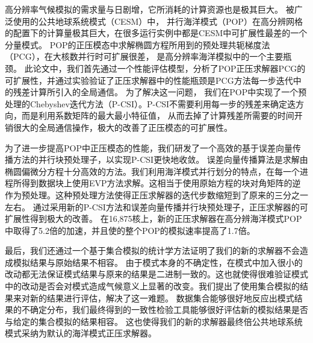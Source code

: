 \begin{cabstract}
  高分辨率气候模拟的需求量与日剧增，它所消耗的计算资源也是极其巨大。 
  被广泛使用的公共地球系统模式（CESM）中， 并行海洋模式（POP）在高分辨网格的配置下的计算量极其巨大，在很多运行实例中都是CESM中可扩展性最差的一个分量模式。 
  POP的正压模态中求解椭圆方程所用到的预处理共轭梯度法（PCG），在大核数并行时可扩展很差， 是高分辨率海洋模拟中的一个主要瓶颈。 
  此论文中，我们首先通过一个性能评估模型，分析了POP正压求解器PCG的可扩展性，并通过实验验证了正压求解器中的性能瓶颈是PCG方法每一步迭代中的残差计算所引入的全局通信。 
  为了解决这一问题， 我们在POP中实现了一个预处理的Chebyshev迭代方法（P-CSI）。P-CSI不需要利用每一步的残差来确定迭方向，而是利用系数矩阵的最大最小特征值，
  从而去掉了计算残差所需要的时间开销很大的全局通信操作，极大的改善了正压模态的可扩展性。

  为了进一步提高POP中正压模态的性能，我们研发了一个高效的基于误差向量传播方法的并行块预处理子，以实现P-CSI更快地收敛。 
  误差向量传播算法是求解由椭圆偏微分方程十分高效的方法。我们利用海洋模式并行划分的特点，在每一个进程所得到数据块上使用EVP方法求解。这相当于使用原始方程的块对角矩阵的逆作为预处理。这种预处理方法使得正压求解器的迭代步数缩短到了原来的三分之一左右。 
  通过采用新的P-CSI方法和误差向量传播并行块预处理子，正压求解器的可扩展性得到极大的改善。 在16,875核上，新的正压求解器在高分辨海洋模式POP中取得了5.2倍的加速，并且使的整个POP的模拟速率提高了1.7倍。 
  

  最后，我们还通过一个基于集合模拟的统计学方法证明了我们的新的求解器不会造成模拟结果与原始结果不相容。 
  由于模式本身的不确定性，在模式中加入很小的改动都无法保证模式结果与原来的结果是二进制一致的。这也就使得很难验证模式中的改动是否会对模式造成气候意义上显著的改变。我们提出了使用集合模拟的结果来对新的结果进行评估，解决了这一难题。 数据集合能够很好地反应出模式结果的不确定分布，我们最终得到的一致性检验工具能够很好评估新的模拟结果是否与给定的集合模拟的结果相容。  
  这也使得我们的新的求解器最终倍公共地球系统模式采纳为默认的海洋模式正压求解器。

\end{cabstract}


